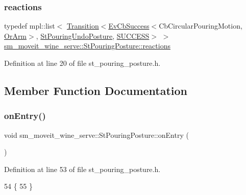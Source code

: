 \subsubsection{\texorpdfstring{reactions}{reactions}}
{\footnotesize\ttfamily typedef mpl\+::list$<$ \hyperlink{classsmacc_1_1Transition}{Transition}$<$\hyperlink{structsmacc_1_1EvCbSuccess}{Ev\+Cb\+Success}$<$Cb\+Circular\+Pouring\+Motion, \hyperlink{classsm__moveit__wine__serve_1_1OrArm}{Or\+Arm}$>$, \hyperlink{structsm__moveit__wine__serve_1_1StPouringUndoPosture}{St\+Pouring\+Undo\+Posture}, \hyperlink{structsmacc_1_1default__transition__tags_1_1SUCCESS}{S\+U\+C\+C\+E\+SS}$>$ $>$ \hyperlink{structsm__moveit__wine__serve_1_1StPouringPosture_a6ee3787a121256e15cdbdfa5864810fa}{sm\+\_\+moveit\+\_\+wine\+\_\+serve\+::\+St\+Pouring\+Posture\+::reactions}}



Definition at line 20 of file st\+\_\+pouring\+\_\+posture.\+h.



\subsection{Member Function Documentation}
\mbox{\label{structsm__moveit__wine__serve_1_1StPouringPosture_acb885a26c8459d0cb624ff1be9c87482}} 
\subsubsection{\texorpdfstring{on\+Entry()}{onEntry()}}
{\footnotesize\ttfamily void sm\+\_\+moveit\+\_\+wine\+\_\+serve\+::\+St\+Pouring\+Posture\+::on\+Entry (\begin{DoxyParamCaption}{ }\end{DoxyParamCaption})\hspace{0.3cm}{\ttfamily [inline]}}



Definition at line 53 of file st\+\_\+pouring\+\_\+posture.\+h.


\begin{DoxyCode}
54         \{
55         \}
\end{DoxyCode}
\mbox{\label{structsm__moveit__wine__serve_1_1StPouringPosture_a2c66c9ea54f197e06c3e2e075faeb360}} 

